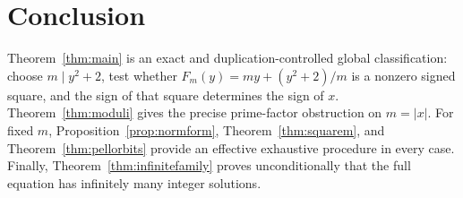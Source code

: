 \documentclass[11pt,a4paper]{amsart}
\numberwithin{equation}{section}
\theoremstyle{definition}
\begin{document}
\section{Conclusion}

Theorem~\ref{thm:main} is an exact and duplication-controlled global
classification: choose \(m\mid y^2+2\), test whether
\(F_m(y)=my+(y^2+2)/m\) is a nonzero signed square, and the sign of that
square determines the sign of \(x\).  Theorem~\ref{thm:moduli} gives
the precise prime-factor obstruction on \(m=|x|\).  For fixed \(m\),
Proposition~\ref{prop:normform}, Theorem~\ref{thm:squarem}, and
Theorem~\ref{thm:pellorbits} provide an effective exhaustive procedure
in every case.  Finally, Theorem~\ref{thm:infinitefamily} proves
unconditionally that the full equation has infinitely many integer
solutions.
\end{document}
